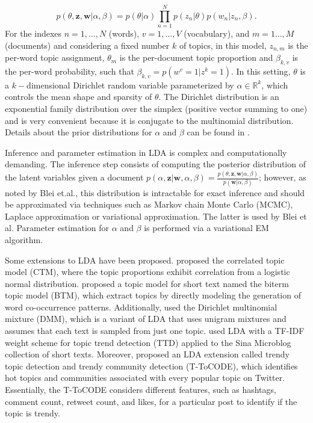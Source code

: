 \documentclass{article}
\begin{document}
\begin{displaymath}
    p(\theta,\mathbf{z},\mathbf{w}|\alpha,\beta)=
    p(\theta|\alpha)\prod_{n=1}^N p(z_n|\theta)p(w_n|z_n,\beta).
\end{displaymath}
For the indexes $n=1,\ldots,N$ (words), $v=1,\ldots,V$ (vocabulary), and $m=1\ldots,M$ (documents) and considering a fixed number $k$ of topics, in this model, $z_{n,m}$  is the per-word topic assignment, $\theta_m$ is the per-document topic proportion and $\beta_{k,v}$ is the per-word probability, such that $\beta_{k,v}=p(w^v=1|z^k=1)$. In this setting, $\theta$ is a $k-$dimensional Dirichlet random variable parameterized by $\alpha \in \mathbb{R}^k$, which controls the mean shape and sparsity of $\theta$. The Dirichlet distribution is an exponential family distribution over the simplex (positive vector summing to one) and is very convenient because it is conjugate to the multinomial distribution. Details about the prior distributions for $\alpha$ and $\beta$ can be found in \cite{lda2003}.

Inference and parameter estimation in LDA is complex and computationally demanding. The inference step consists of computing the posterior distribution of the latent variables given a document $p(\alpha,\mathbf{z}|\mathbf{w},\alpha,\beta)= \frac{p(\theta,\mathbf{z},\mathbf{w}|\alpha,\beta)}{p(\mathbf{w}|\alpha,\beta)}$; however, as noted by Blei et.al., this distribution is intractable for exact inference and should be approximated via techniques such as Markov chain Monte Carlo (MCMC), Laplace approximation or variational approximation. The latter is used by Blei et al. Parameter estimation for $\alpha$ and $\beta$ is performed via a variational EM algorithm.

Some extensions to LDA have been proposed. \cite{Blei2005} proposed the correlated topic model (CTM), where the topic proportions exhibit correlation from a logistic normal distribution. \cite{Yan2013} proposed  a topic model for short text named the biterm topic model (BTM), which extract topics by directly modeling the generation of word co-occurrence patterns. Additionally, \cite{Yin2014} used the Dirichlet multinomial mixture (DMM), which is a variant of LDA that uses unigram mixtures and assumes that each text is sampled from just one topic. \cite{Liyan2018} used LDA with a TF-IDF weight scheme for topic trend detection (TTD) applied to the Sina Microblog collection of short texts. Moreover, \cite{Pagare2020} proposed an LDA extension called trendy topic detection and trendy community detection (T-ToCODE), which identifies hot topics and communities associated with every popular topic on Twitter. Essentially, the T-ToCODE considers different features, such as  hashtags, comment count, retweet count, and likes, for a particular post to identify if the topic is trendy.
\end{document}
